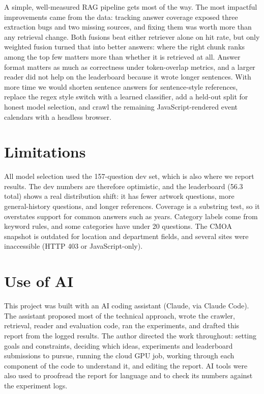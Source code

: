 \documentclass[11pt]{article}
\begin{document}
A simple, well-measured RAG pipeline gets most of the way. The most impactful improvements came from the data: tracking answer coverage exposed three extraction bugs and two missing sources, and fixing them was worth more than any retrieval change. Both fusions beat either retriever alone on hit rate, but only weighted fusion turned that into better answers: where the right chunk ranks among the top few matters more than whether it is retrieved at all. Answer format matters as much as correctness under token-overlap metrics, and a larger reader did not help on the leaderboard because it wrote longer sentences. With more time we would shorten sentence answers for sentence-style references, replace the regex style switch with a learned classifier, add a held-out split for honest model selection, and crawl the remaining JavaScript-rendered event calendars with a headless browser.

\section*{Limitations}

All model selection used the 157-question dev set, which is also where we report results. The dev numbers are therefore optimistic, and the leaderboard (56.3 total) shows a real distribution shift: it has fewer artwork questions, more general-history questions, and longer references. Coverage is a substring test, so it overstates support for common answers such as years. Category labels come from keyword rules, and some categories have under 20 questions. The CMOA snapshot is outdated for location and department fields, and several sites were inaccessible (HTTP 403 or JavaScript-only).

\section*{Use of AI}

This project was built with an AI coding assistant (Claude, via Claude Code). The assistant proposed most of the technical approach, wrote the crawler, retrieval, reader and evaluation code, ran the experiments, and drafted this report from the logged results. The author directed the work throughout: setting goals and constraints, deciding which ideas, experiments and leaderboard submissions to pursue, running the cloud GPU job, working through each component of the code to understand it, and editing the report. AI tools were also used to proofread the report for language and to check its numbers against the experiment logs.


\end{document}
